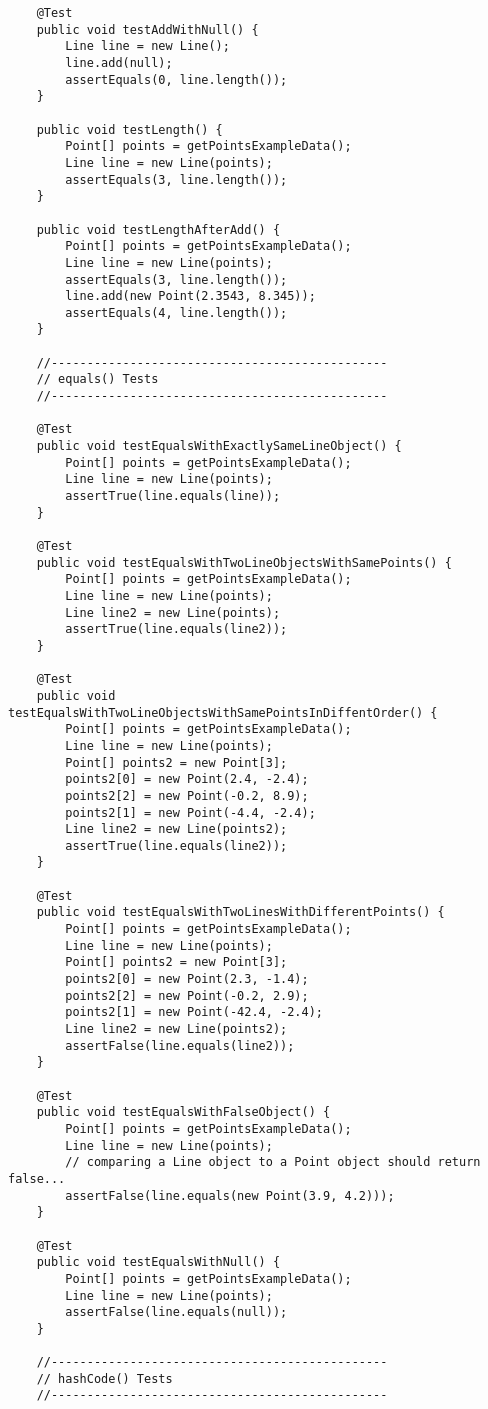 \begin{lstlisting}
	@Test
	public void testAddWithNull() {
		Line line = new Line();
		line.add(null);
		assertEquals(0, line.length());
	}
	
	public void testLength() {
		Point[] points = getPointsExampleData();
		Line line = new Line(points);
		assertEquals(3, line.length());
	}
	
	public void testLengthAfterAdd() {
		Point[] points = getPointsExampleData();
		Line line = new Line(points);
		assertEquals(3, line.length());
		line.add(new Point(2.3543, 8.345));
		assertEquals(4, line.length());
	}
	
	//-----------------------------------------------
	// equals() Tests
	//-----------------------------------------------
	
	@Test
	public void testEqualsWithExactlySameLineObject() {
		Point[] points = getPointsExampleData();
		Line line = new Line(points);
		assertTrue(line.equals(line));
	}
	
	@Test
	public void testEqualsWithTwoLineObjectsWithSamePoints() {
		Point[] points = getPointsExampleData();
		Line line = new Line(points);
		Line line2 = new Line(points);
		assertTrue(line.equals(line2));
	}
	
	@Test
	public void testEqualsWithTwoLineObjectsWithSamePointsInDiffentOrder() {
		Point[] points = getPointsExampleData();
		Line line = new Line(points);
		Point[] points2 = new Point[3];
		points2[0] = new Point(2.4, -2.4);
		points2[2] = new Point(-0.2, 8.9);
		points2[1] = new Point(-4.4, -2.4);
		Line line2 = new Line(points2);
		assertTrue(line.equals(line2));
	}
	
	@Test
	public void testEqualsWithTwoLinesWithDifferentPoints() {
		Point[] points = getPointsExampleData();
		Line line = new Line(points);
		Point[] points2 = new Point[3];
		points2[0] = new Point(2.3, -1.4);
		points2[2] = new Point(-0.2, 2.9);
		points2[1] = new Point(-42.4, -2.4);
		Line line2 = new Line(points2);
		assertFalse(line.equals(line2));
	}
	
	@Test
	public void testEqualsWithFalseObject() {
		Point[] points = getPointsExampleData();
		Line line = new Line(points);
		// comparing a Line object to a Point object should return false...
		assertFalse(line.equals(new Point(3.9, 4.2)));
	}
	
	@Test
	public void testEqualsWithNull() {
		Point[] points = getPointsExampleData();
		Line line = new Line(points);
		assertFalse(line.equals(null));
	}
	
	//-----------------------------------------------
	// hashCode() Tests
	//-----------------------------------------------
	

\end{lstlisting}
